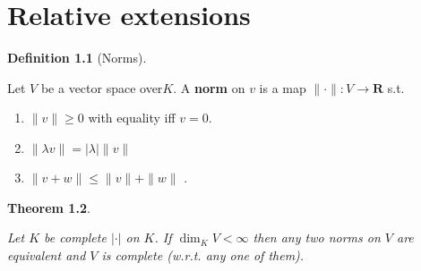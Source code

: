 \documentclass[10pt,]{book}
\newcommand{\lt}{<}
\newcommand{\terminology}[1]{\textbf{#1}}
\theoremstyle{plain}
\newtheorem{theorem}{Theorem}[section]
\theoremstyle{definition}
\newtheorem{definition}[theorem]{Definition}
\newcommand{\RR}{\mathbf{R}}
\newcommand{\ab}{|\cdot|}
\begin{document}
\chapter[Relative extensions]{Relative extensions}\label{chap-relative}
\begin{definition}[Norms]\label{definition-10}

          Let \(V\) be a vector space over\(K\).
          A \terminology{norm} on \(v\) is a map \(\|\cdot\|\colon V \to \RR\) s.t.
          \begin{enumerate}
\item{}\(\|v\| \ge 0\) with equality iff \(v = 0\).\item{}\(\|\lambda v\| = |\lambda| \|v\|\)\item{} \(\|v+w\| \le \|v\| + \|w\|\) .\end{enumerate}
\end{definition}
\begin{theorem}\label{theorem-7}

          Let \(K\) be complete \(\ab\) on \(K\). If \(\dim_K V \lt \infty\) then any two norms on \(V\) are equivalent and \(V\) is complete (w.r.t. any one of them).
        \end{theorem}
\end{document}
